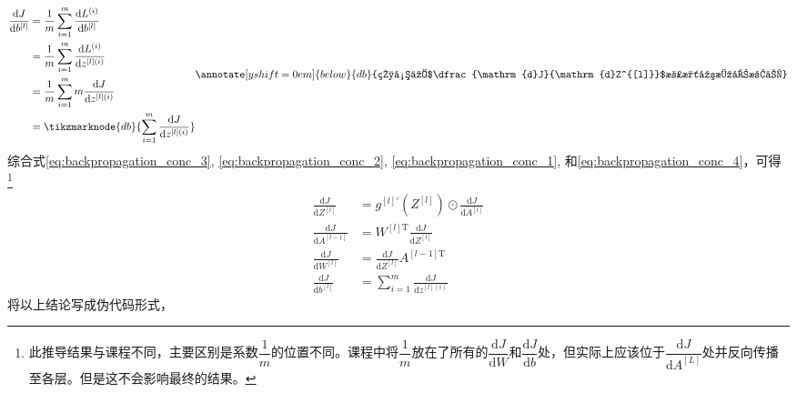 \begin{equation}
    \begin{aligned}
        \frac{\mathrm{d}J}{\mathrm{d}b^{[l]}} 
        &= \frac{1}{m} \sum_{i=1}^{m} \frac{\mathrm{d}L^{(i)}}{\mathrm{d}b^{[l]}} \\
        &= \frac{1}{m} \sum_{i=1}^{m} \frac{\mathrm{d}L^{(i)}}{\mathrm{d}z^{[l](i)}} \\
        &= \frac{1}{m} \sum_{i=1}^{m} m \frac{\mathrm{d}J}{\mathrm{d}z^{[l](i)}} \\
        &= \tikzmarknode{db}{\sum_{i=1}^{m} \frac{\mathrm{d}J}{\mathrm{d}z^{[l](i)}}}
    \label{eq:backpropagation_conc_4}
    \end{aligned}
    \vspace{2em}
    \renewcommand{\eqnannotationstrut}{\rule[-0.7\baselineskip]{0pt}{1.5\baselineskip}}
    \annotate[yshift=0em]{below}{db}{相当于$\dfrac{\mathrm{d}J}{\mathrm{d}Z^{[l]}}$沿水平方向求和}
    \renewcommand{\eqnannotationstrut}{\strut} %
\end{equation}
综合式\eqref{eq:backpropagation_conc_3}, \eqref{eq:backpropagation_conc_2}, \eqref{eq:backpropagation_conc_1}, 和\eqref{eq:backpropagation_conc_4}，可得
\footnote{此推导结果与课程不同，主要区别是系数$\dfrac{1}{m}$的位置不同。课程中将$\dfrac{1}{m}$放在了所有的$\dfrac{\mathrm{d}J}{\mathrm{d}W}$和$\dfrac{\mathrm{d}J}{\mathrm{d}b}$处，但实际上应该位于$\dfrac{\mathrm{d}J}{\mathrm{d}A^{[L]}}$处并反向传播至各层。但是这不会影响最终的结果。}
\begin{align}
    \frac{\mathrm{d}J}{\mathrm{d}Z^{[l]}} &= g^{[l]'}(Z^{[l]}) \odot \frac{\mathrm{d}J}{\mathrm{d}A^{[l]}} \\
    \frac{\mathrm{d}J}{\mathrm{d}A^{[l-1]}} &= W^{[l] \mathrm{T}} \frac{\mathrm{d}J}{\mathrm{d}Z^{[l]}} \\
    \frac{\mathrm{d}J}{\mathrm{d}W^{[l]}} &= \frac{\mathrm{d}J}{\mathrm{d}Z^{[l]}} A^{[l-1] \mathrm{T}} \label{eq:dw_real} \\
    \frac{\mathrm{d}J}{\mathrm{d}b^{[l]}} &= \sum_{i=1}^{m} \frac{\mathrm{d}J}{\mathrm{d}z^{[l](i)}} \label{eq:db_real}
\end{align}
将以上结论写成伪代码形式，
